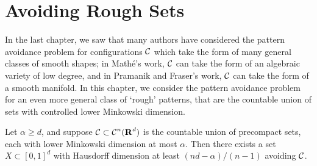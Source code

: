 
\chapter{Avoiding Rough Sets}
\label{ch:RoughSets}

In the last chapter, we saw that many authors have considered the pattern avoidance problem for configurations $\operatorname{\mathcal{C}}$ which take the form of many general classes of smooth shapes; in Math\'{e}'s work, $\operatorname{\mathcal{C}}$ can take the form of an algebraic variety of low degree, and in Pramanik and Fraser's work, $\operatorname{\mathcal{C}}$ can take the form of a smooth manifold. In this chapter, we consider the pattern avoidance problem for an even more general class of `rough' patterns, that are the countable union of sets with controlled lower Minkowski dimension.
%
\begin{theorem}\label{mainTheorem}
	Let $\alpha \geq d$, and suppose $\operatorname{\mathcal{C}} \subset \operatorname{\mathcal{C}}^n(\operatorname{\mathbf{R}}^d)$ is the countable union of precompact sets, each with lower Minkowski dimension at most $\alpha$. Then there exists a set $X \subset [0,1]^d$ with Hausdorff dimension at least $(nd - \alpha)/(n-1)$ avoiding $\operatorname{\mathcal{C}}$.
\end{theorem}

